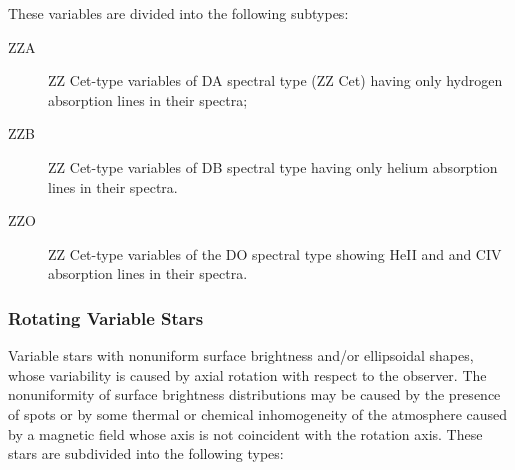 \begin{description}
				These variables are divided into the following subtypes:
	\begin{description}
\item[ZZA]		ZZ Cet-type variables of DA spectral type (ZZ Cet) having
				only hydrogen absorption lines in their spectra;
\item[ZZB]		ZZ Cet-type variables of DB spectral type having only
				helium absorption lines in their spectra.
\item[ZZO]		ZZ Cet-type variables of the DO spectral type showing
                HeII and and CIV absorption lines in their spectra.
	\end{description}
\end{description}

\subsubsection{Rotating Variable Stars}
\label{rotating-variable-stars}

Variable stars with nonuniform surface brightness and/or ellipsoidal
shapes, whose variability is caused by axial rotation with respect to
the observer. The nonuniformity of surface brightness distributions may
be caused by the presence of spots or by some thermal or chemical
inhomogeneity of the atmosphere caused by a magnetic field whose axis is
not coincident with the rotation axis. These stars are subdivided into
the following types:

